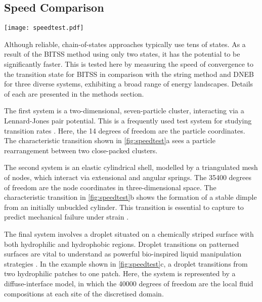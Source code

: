 \documentclass[twocolumn,10pt]{revtex4}
\begin{document}
\subsection{Speed Comparison}
\begin{figure*}[tb]
  \texttt{[image: speedtest.pdf]}
  \caption{\label{fig:speedtest}
    Comparisons between BITSS, DNEB, and the string method in the convergence to the transition state as a function of the number of calculations of the energy gradient.
    Three test systems are used: (a) a Lennard-Jones seven-particle cluster, (b) cylindrical shell buckling, and (c) wetting of a chemically-striped surface.
    The configurations shown correspond to the two minimum energy states and the transition state, marked by an asterisk.
    The string method and DNEB are repeated with a differing number of images, as listed in the legend in (c).
  }
\end{figure*}

Although reliable, chain-of-states approaches typically use tens of states.
As a result of the BITSS method using only two states, it has the potential to be significantly faster.
This is tested here by measuring the speed of convergence to the transition state for BITSS in comparison with the string method and DNEB for three diverse systems, exhibiting a broad range of energy landscapes.
Details of each are presented in the methods section.

The first system is a two-dimensional, seven-particle cluster, interacting via a Lennard-Jones pair potential.
This is a frequently used test system for studying transition rates \cite{Wales2002,Passerone2001}.
Here, the \num{14} degrees of freedom are the particle coordinates.
The characteristic transition shown in \cref{fig:speedtest}a sees a particle rearrangement between two close-packed clusters.

The second system is an elastic cylindrical shell, modelled by a triangulated mesh of nodes, which interact via extensional and angular springs.
The \num{35400} degrees of freedom are the node coordinates in three-dimensional space.
The characteristic transition in \cref{fig:speedtest}b shows the formation of a stable dimple from an initially unbuckled cylinder.
This transition is essential to capture to predict mechanical failure under strain \cite{Panter2019,Virot2017}.

The final system involves a droplet situated on a chemically striped surface with both hydrophilic and hydrophobic regions.
Droplet transitions on patterned surfaces are vital to understand as powerful bio-inspired liquid manipulation strategies  \cite{Kusumaatmaja2006,Brown2016}.
In the example shown in \cref{fig:speedtest}c, a droplet transitions from two hydrophilic patches to one patch.
Here, the system is represented by a diffuse-interface model, in which the \num{40000} degrees of freedom are the local fluid compositions at each site of the discretised domain.
\end{document}
